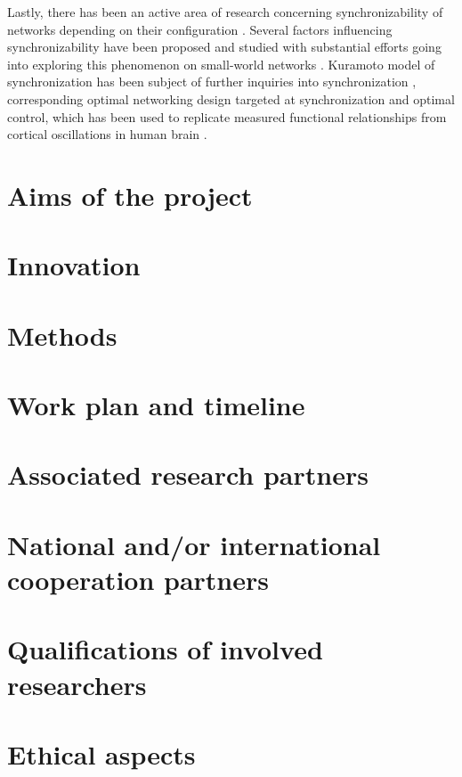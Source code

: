 \documentclass[a4paper,11pt]{scrartcl}
\begin{document}
Lastly, there has been an active area of research concerning synchronizability of networks depending on their configuration \cite{Hong2004, Nishikawa2003}. Several factors influencing synchronizability have been proposed and studied with substantial efforts going into exploring this phenomenon on small-world networks \cite{Hong2002, Hong2002-1}. Kuramoto model of synchronization has been subject of further inquiries into synchronization \cite{Hong2011}, corresponding optimal networking design targeted at synchronization \cite{Fazlyab2017, Nishikawa2006} and optimal control, which has been used to replicate measured functional relationships from cortical oscillations in human brain \cite{Menara2022}.


\section{Aims of the project}\label{sec:aims}

\section{Innovation}\label{sec:innovation}

\section{Methods}\label{sec:methods}

\section{Work plan and timeline}\label{sec:workplan}

\section{Associated research partners}\label{sec:partners}

\section{National and/or international cooperation partners}\label{sec:cooperations}


\section{Qualifications of involved researchers}\label{sec:qualifications}

\section{Ethical aspects}\label{sec:ethics}
\end{document}
